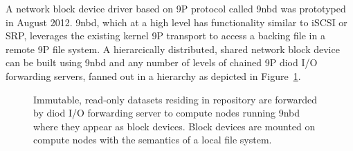 A network block device driver based on 9P protocol called 9nbd\cite{9nbd}
was prototyped in August 2012.
9nbd, which at a high level has functionality similar to iSCSI or SRP,
leverages the existing kernel 9P transport to access a backing file
in a remote 9P file system.
A hierarcically distributed, shared network block device can be built
using 9nbd and any number of levels of chained 9P diod\cite{diod}
I/O forwarding servers, fanned out in a hierarchy as depicted in
Figure~\ref{Fig9nbd}.
\begin{figure}
\centering
{}
\caption{
Immutable, read-only datasets residing in repository are forwarded by diod
I/O forwarding server to compute nodes running 9nbd where they appear
as block devices.  Block devices are mounted on compute nodes with
the semantics of a local file system.
}
\label{Fig9nbd}
\end{figure}

